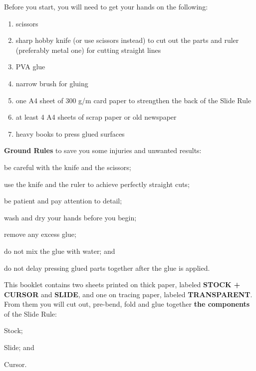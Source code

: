   \begin{multicols*}{3}
  \normalsize{Before you start, you will need to get your hands on the following:
    \begin{enumerate}
      \setlength{\parskip}{0pt}
      \setlength{\parsep}{0pt}
      \item scissors
      \item sharp hobby knife (or use scissors instead) to cut out the parts and ruler (preferably metal one) for cutting straight lines
      \item PVA glue
      \item narrow brush for gluing
      \item one A4 sheet of 300 g/m card paper to strengthen the back of the Slide Rule
      \item at least 4 A4 sheets of scrap paper or old newspaper
      \item heavy books to press glued surfaces
    \end{enumerate}

  \textbf{Ground Rules} to save you some injuries and unwanted results:
    \begin{inparaenum}
      \item be careful with the knife and the scissors;
      \item use the knife and the ruler to achieve perfectly straight cuts;
      \item be patient and pay attention to detail;
      \item wash and dry your hands before you begin;
      \item remove any excess glue;
      \item do not mix the glue with water; and
      \item do not delay pressing glued parts together after the glue is applied.
    \end{inparaenum}

  This booklet contains two sheets printed on thick paper, labeled \textbf{STOCK + CURSOR} and \textbf{SLIDE}, and one on tracing paper, labeled \textbf{TRANSPARENT}. From them you will cut out, pre-bend, fold and glue together \textbf{the components} of the Slide Rule:
    \begin{inparaenum}
      \item Stock;
      \item Slide; and
      \item Cursor.
    \end{inparaenum}

}
\end{multicols*}
